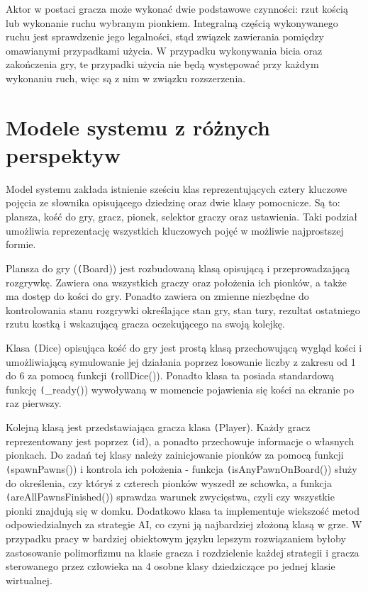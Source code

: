 \documentclass[conference]{IEEEtran}
\begin{document}
Aktor w postaci gracza może wykonać dwie podstawowe czynności: rzut kością lub wykonanie ruchu wybranym pionkiem. Integralną częścią wykonywanego ruchu jest sprawdzenie jego legalności, stąd związek zawierania pomiędzy omawianymi przypadkami użycia. W przypadku wykonywania bicia oraz zakończenia gry, te przypadki użycia nie będą występować przy każdym wykonaniu ruch, więc są z nim w związku rozszerzenia.

\section{Modele systemu z różnych perspektyw}
Model systemu zakłada istnienie sześciu klas reprezentujących cztery kluczowe pojęcia ze słownika opisującego dziedzinę oraz dwie klasy pomocnicze. Są to: plansza, kość do gry, gracz, pionek, selektor graczy oraz ustawienia. Taki podział umożliwia reprezentację wszystkich kluczowych pojęć w możliwie najprostszej formie.


Plansza do gry (\texttt(Board)) jest rozbudowaną klasą opisującą i przeprowadzającą rozgrywkę. Zawiera ona wszystkich graczy oraz położenia ich pionków, a także ma dostęp do kości do gry. Ponadto zawiera on zmienne niezbędne do kontrolowania stanu rozgrywki określające stan gry, stan tury, rezultat ostatniego rzutu kostką i wskazującą gracza oczekującego na swoją kolejkę.


Klasa \texttt(Dice) opisująca kość do gry jest prostą klasą przechowującą wygląd kości i umożliwiającą symulowanie jej działania poprzez losowanie liczby z zakresu od 1 do 6 za pomocą funkcji \texttt(rollDice()). Ponadto klasa ta posiada standardową funkcję \texttt(\_ready()) wywoływaną w momencie pojawienia się kości na ekranie po raz pierwszy.


Kolejną klasą jest przedstawiająca gracza klasa \texttt(Player). Każdy gracz reprezentowany jest poprzez \texttt(id), a ponadto przechowuje informacje o własnych pionkach. Do zadań tej klasy należy zainicjowanie pionków za pomocą funkcji \texttt(spawnPawns()) i kontrola ich położenia - funkcja \texttt(isAnyPawnOnBoard()) służy do określenia, czy któryś z czterech pionków wyszedł ze schowka, a funkcja \texttt(areAllPawnsFinished()) sprawdza warunek zwycięstwa, czyli czy wszystkie pionki znajdują się w domku. Dodatkowo klasa ta implementuje wiekszość metod odpowiedzialnych za strategie AI, co czyni ją najbardziej złożoną klasą w grze. W przypadku pracy w bardziej obiektowym języku lepszym rozwiązaniem byłoby zastosowanie polimorfizmu na klasie gracza i rozdzielenie każdej strategii i gracza sterowanego przez człowieka na 4 osobne klasy dziedziczące po jednej klasie wirtualnej.
\end{document}
